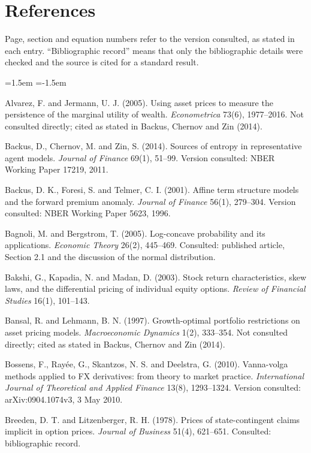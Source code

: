 \documentclass[11pt]{article}
\theoremstyle{result}
\begin{document}
\section*{References}
Page, section and equation numbers refer to the version consulted, as stated in each entry. ``Bibliographic record'' means that only the bibliographic details were checked and the source is cited for a standard result.

\smallskip
\begin{list}{}{\leftmargin=1.5em \itemindent=-1.5em \itemsep=2pt \parsep=0pt}\small
\item Alvarez, F. and Jermann, U. J. (2005). Using asset prices to measure the persistence of the marginal utility of wealth. \emph{Econometrica} 73(6), 1977--2016. Not consulted directly; cited as stated in Backus, Chernov and Zin (2014).
\item Backus, D., Chernov, M. and Zin, S. (2014). Sources of entropy in representative agent models. \emph{Journal of Finance} 69(1), 51--99. Version consulted: NBER Working Paper 17219, 2011.
\item Backus, D. K., Foresi, S. and Telmer, C. I. (2001). Affine term structure models and the forward premium anomaly. \emph{Journal of Finance} 56(1), 279--304. Version consulted: NBER Working Paper 5623, 1996.
\item Bagnoli, M. and Bergstrom, T. (2005). Log-concave probability and its applications. \emph{Economic Theory} 26(2), 445--469. Consulted: published article, Section 2.1 and the discussion of the normal distribution.
\item Bakshi, G., Kapadia, N. and Madan, D. (2003). Stock return characteristics, skew laws, and the differential pricing of individual equity options. \emph{Review of Financial Studies} 16(1), 101--143.
\item Bansal, R. and Lehmann, B. N. (1997). Growth-optimal portfolio restrictions on asset pricing models. \emph{Macroeconomic Dynamics} 1(2), 333--354. Not consulted directly; cited as stated in Backus, Chernov and Zin (2014).
\item Bossens, F., Ray\'ee, G., Skantzos, N. S. and Deelstra, G. (2010). Vanna-volga methods applied to FX derivatives: from theory to market practice. \emph{International Journal of Theoretical and Applied Finance} 13(8), 1293--1324. Version consulted: arXiv:0904.1074v3, 3 May 2010.
\item Breeden, D. T. and Litzenberger, R. H. (1978). Prices of state-contingent claims implicit in option prices. \emph{Journal of Business} 51(4), 621--651. Consulted: bibliographic record.

\end{list}
\end{document}
